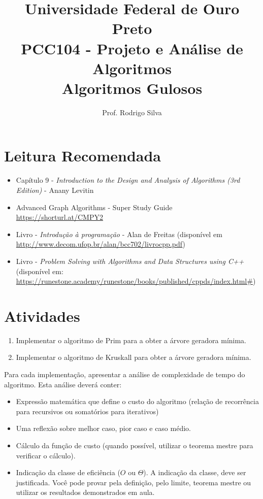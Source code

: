 \documentclass{article}
\title{\vspace{-2 cm}Universidade Federal de Ouro Preto \\ PCC104 - Projeto e Análise de Algoritmos \\ Algoritmos Gulosos}
\author{Prof. Rodrigo Silva}
\begin{document}
\maketitle

\section*{Leitura Recomendada}

\begin{itemize}
    \item Capítulo 9 - \textit{Introduction to the Design and Analysis of Algorithms (3rd Edition)} - Anany Levitin 
    \item Advanced Graph Algorithms - Super Study Guide \url{https://shorturl.at/CMPY2}
    \item Livro - \textit{Introdução à programação} - Alan de Freitas (disponível em \url{http://www.decom.ufop.br/alan/bcc702/livrocpp.pdf})
    \item Livro - \textit{Problem Solving with Algorithms and Data Structures using C++} (disponível em: \url{https://runestone.academy/runestone/books/published/cppds/index.html#})
\end{itemize}


\section{Atividades}

\begin{enumerate}
    \item Implementar o algoritmo de Prim para a obter a árvore geradora mínima.
    \item Implementar o algoritmo de Kruskall para obter a árvore geradora mínima. 
\end{enumerate}

Para cada implementação, apresentar a análise de complexidade de tempo do algoritmo. Esta análise deverá conter:

\begin{itemize}
    \item Expressão matemática que define o custo do algoritmo (relação de recorrência para recursivos ou somatórios para iterativos) 
    \item Uma reflexão sobre melhor caso, pior caso e caso médio.
    \item Cálculo da função de custo (quando possível, utilizar o teorema mestre para verificar o cálculo).
    \item Indicação da classe de eficiência ($O$ ou $\Theta$). A indicação da classe, deve ser justificada. Você pode provar pela definição, pelo limite, teorema mestre ou utilizar os resultados demonstrados em aula.
\end{itemize}


%
%
\end{document}
